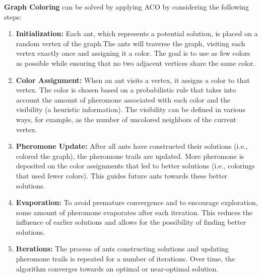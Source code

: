 \documentclass{article}
\theoremstyle{mytheoremstyle}
\theoremstyle{mytheoremstyle}
\theoremstyle{myproblemstyle}
\begin{document}
\textbf{Graph Coloring} can be solved by applying ACO by considering the following steps:
\begin{enumerate}
    \item \textbf{Initialization:} Each ant, which represents a potential solution, is placed on a random vertex of the graph.The ants will traverse the graph, visiting each vertex exactly once and assigning it a color. The goal is to use as few colors as possible while ensuring that no two adjacent vertices share the same color.
    \item \textbf{Color Assignment:} When an ant visits a vertex, it assigns a color to that vertex. The color is chosen based on a probabilistic rule that takes into account the amount of pheromone associated with each color and the visibility (a heuristic information). The visibility can be defined in various ways, for example, as the number of uncolored neighbors of the current vertex.
    \item \textbf{Pheromone Update:} After all ants have constructed their solutions (i.e., colored the graph), the pheromone trails are updated. More pheromone is deposited on the color assignments that led to better solutions (i.e., colorings that used fewer colors). This guides future ants towards these better solutions.
    \item \textbf{Evaporation:} To avoid premature convergence and to encourage exploration, some amount of pheromone evaporates after each iteration. This reduces the influence of earlier solutions and allows for the possibility of finding better solutions.
    \item \textbf{Iterations:} The process of ants constructing solutions and updating pheromone trails is repeated for a number of iterations. Over time, the algorithm converges towards an optimal or near-optimal solution.
\end{enumerate}

\end{document}
